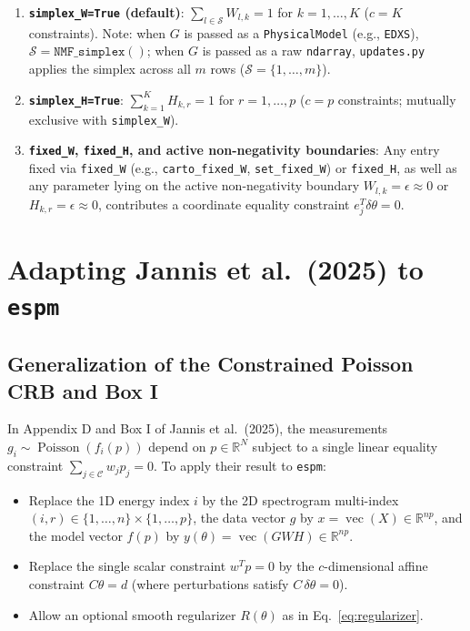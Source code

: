 \documentclass[11pt,a4paper]{article}
\theoremstyle{plain}
\theoremstyle{definition}
\theoremstyle{remark}
\newcommand{\R}{\mathbb{R}}
\newcommand{\cS}{\mathcal{S}}
\newcommand{\cC}{\mathcal{C}}
\newcommand{\vecop}{\operatorname{vec}}
\begin{document}
\begin{enumerate}[leftmargin=1.5em]
    \item \textbf{\texttt{simplex\_W=True} (default)}: $\sum_{l \in \cS} W_{l,k} = 1$ for $k = 1,\dots,K$ ($c = K$ constraints). Note: when $G$ is passed as a \texttt{PhysicalModel} (e.g., \texttt{EDXS}), $\cS = \texttt{NMF\_simplex}()$; when $G$ is passed as a raw \texttt{ndarray}, \texttt{updates.py} applies the simplex across all $m$ rows ($\cS = \{1,\dots,m\}$).
    \item \textbf{\texttt{simplex\_H=True}}: $\sum_{k=1}^K H_{k,r} = 1$ for $r = 1,\dots,p$ ($c = p$ constraints; mutually exclusive with \texttt{simplex\_W}).
    \item \textbf{\texttt{fixed\_W}, \texttt{fixed\_H}, and active non-negativity boundaries}: Any entry fixed via \texttt{fixed\_W} (e.g., \texttt{carto\_fixed\_W}, \texttt{set\_fixed\_W}) or \texttt{fixed\_H}, as well as any parameter lying on the active non-negativity boundary $W_{l,k} = \epsilon \approx 0$ or $H_{k,r} = \epsilon \approx 0$, contributes a coordinate equality constraint $e_j^T \delta\theta = 0$.
\end{enumerate}

\section{Adapting Jannis et al.\ (2025) to \texttt{espm}}

\subsection{Generalization of the Constrained Poisson CRB and Box I}
In Appendix D and Box I of Jannis et al.\ (2025), the measurements $g_i \sim \operatorname{Poisson}(f_i(p))$ depend on $p \in \R^N$ subject to a single linear equality constraint $\sum_{j \in \cC} w_j p_j = 0$. To apply their result to \texttt{espm}:
\begin{itemize}[leftmargin=1.5em]
    \item Replace the 1D energy index $i$ by the 2D spectrogram multi-index $(i,r) \in \{1,\dots,n\} \times \{1,\dots,p\}$, the data vector $g$ by $x = \vecop(X) \in \R^{np}$, and the model vector $f(p)$ by $y(\theta) = \vecop(GWH) \in \R^{np}$.
    \item Replace the single scalar constraint $w^T p = 0$ by the $c$-dimensional affine constraint $C\theta = d$ (where perturbations satisfy $C\,\delta\theta = 0$).
    \item Allow an optional smooth regularizer $R(\theta)$ as in Eq.~\eqref{eq:regularizer}.
\end{itemize}
\end{document}
